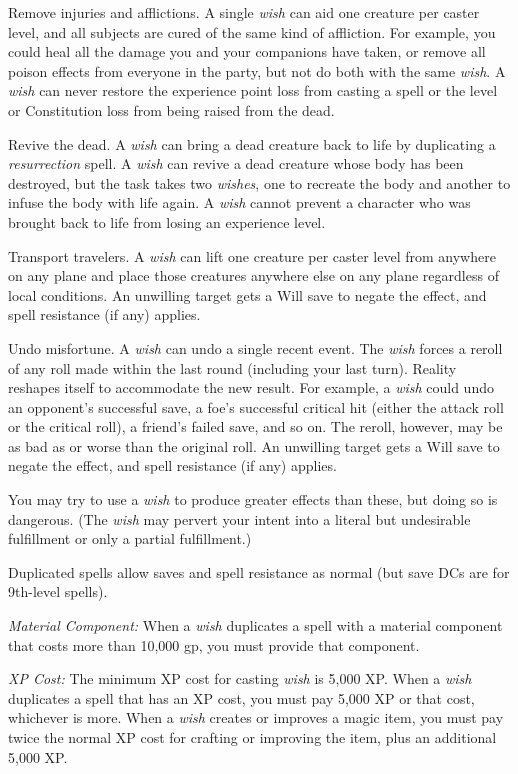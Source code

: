 Remove injuries and afflictions. A single \textit{wish} can aid one creature per 
caster level, and all subjects are cured of the same kind of affliction. For example, 
you could heal all the damage you and your companions have taken, or remove all 
poison effects from everyone in the party, but not do both with the same \textit{wish}. 
A \textit{wish} can never restore the experience point loss from casting a spell 
or the level or Constitution loss from being raised from the dead.%

Revive the dead. A \textit{wish} can bring a dead creature back to life by duplicating 
a \textit{resurrection} spell. A \textit{wish} can revive a dead creature whose 
body has been destroyed, but the task takes two \textit{wishes}, one to recreate 
the body and another to infuse the body with life again. A \textit{wish} cannot 
prevent a character who was brought back to life from losing an experience level.%

Transport travelers. A \textit{wish} can lift one creature per caster level from 
anywhere on any plane and place those creatures anywhere else on any plane regardless 
of local conditions. An unwilling target gets a Will save to negate the effect, 
and spell resistance (if any) applies.%

Undo misfortune. A \textit{wish} can undo a single recent event. The \textit{wish 
}forces a reroll of any roll made within the last round (including your last turn). 
Reality reshapes itself to accommodate the new result. For example, a \textit{wish 
}could undo an opponent's successful save, a foe's successful critical hit (either 
the attack roll or the critical roll), a friend's failed save, and so on. The reroll, 
however, may be as bad as or worse than the original roll. An unwilling target 
gets a Will save to negate the effect, and spell resistance (if any) applies.

You may try to use a \textit{wish} to produce greater effects than these, but doing 
so is dangerous. (The \textit{wish} may pervert your intent into a literal but 
undesirable fulfillment or only a partial fulfillment.)

Duplicated spells allow saves and spell resistance as normal (but save DCs are 
for 9th-level spells).

\textit{Material Component:} When a \textit{wish} duplicates a spell with a material 
component that costs more than 10,000 gp, you must provide that component.

\textit{XP Cost:} The minimum XP cost for casting \textit{wish} is 5,000 XP. When 
a \textit{wish} duplicates a spell that has an XP cost, you must pay 5,000 XP or 
that cost, whichever is more. When a \textit{wish} creates or improves a magic 
item, you must pay twice the normal XP cost for crafting or improving the item, 
plus an additional 5,000 XP.

